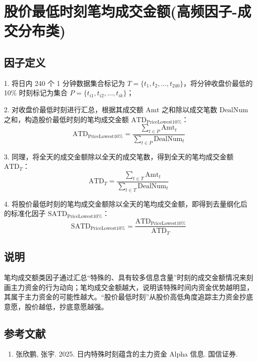 \documentclass{article}
\begin{document}
\section{股价最低时刻笔均成交金额(高频因子-成交分布类)}

\subsection{因子定义}

1. 将日内 240 个 1 分钟数据集合标记为 \( T = \{t_1, t_2, \dots, t_{240}\} \)，将分钟收盘价最低的 10\% 时刻标记为集合 \( P = \{t_{i1}, t_{i2}, \dots, t_{ik}\} \)；

2. 对收盘价最低时刻进行汇总，根据其成交额 \( \mathrm{Amt} \) 之和除以成交笔数 \( \mathrm{DealNum} \) 之和，构造股价最低时刻的笔均成交金额 \( \mathrm{ATD}_{\mathrm{PriceLowest10\%}} \)：
\begin{equation}
    \mathrm{ATD}_{\mathrm{PriceLowest10\%}} = \frac{\sum_{t \in P} \mathrm{Amt}_t}{\sum_{t \in P} \mathrm{DealNum}_t}
\end{equation}

3. 同理，将全天的成交金额除以全天的成交笔数，得到全天的笔均成交金额 \( \mathrm{ATD}_T \)：
\begin{equation}
    \mathrm{ATD}_T = \frac{\sum_{t \in T} \mathrm{Amt}_t}{\sum_{t \in T} \mathrm{DealNum}_t}
\end{equation}

4. 将股价最低时刻的笔均成交金额除以全天的笔均成交金额，即得到去量纲化后的标准化因子 \( \mathrm{SATD}_{\mathrm{PriceLowest10\%}} \)：
\begin{equation}
    \mathrm{SATD}_{\mathrm{PriceLowest10\%}} = \frac{\mathrm{ATD}_{\mathrm{PriceLowest10\%}}}{\mathrm{ATD}_T}
\end{equation}

\subsection{说明}
笔均成交额类因子通过汇总“特殊的、具有较多信息含量”时刻的成交金额情况来刻画主力资金的行为动向；笔均成交金额越大，说明该特殊时间内资金优势越明显，其属于主力资金的可能性越大。“股价最低时刻”从股价高低角度追踪主力资金抄底意愿，股价越低，抄底意愿越强。

\subsection{参考文献}
\begin{enumerate}
    \item 张欣鹏, 张宇. 2025. 日内特殊时刻蕴含的主力资金 Alpha 信息. 国信证券.
\end{enumerate}
\end{document}
